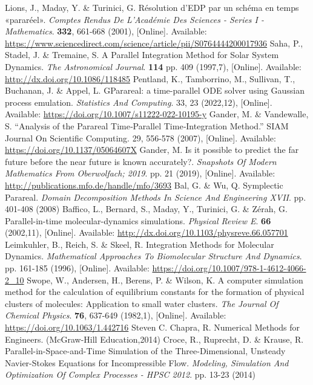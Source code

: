 \documentclass[conference]{IEEEtran}
\begin{document}
\begin{thebibliography}{00}
Lions, J., Maday, Y. \& Turinici, G. Résolution d'EDP par un schéma en temps «pararéel». {\em Comptes Rendus De L'Académie Des Sciences - Series I - Mathematics}. \textbf{332}, 661-668 (2001), [Online]. Available: \url{https://www.sciencedirect.com/science/article/pii/S0764444200017936}
Saha, P., Stadel, J. \& Tremaine, S. A Parallel Integration Method for Solar System Dynamics. {\em The Astronomical Journal}. \textbf{114} pp. 409 (1997,7), [Online]. Available: \url{http://dx.doi.org/10.1086/118485}
Pentland, K., Tamborrino, M., Sullivan, T., Buchanan, J. \& Appel, L. GParareal: a time-parallel ODE solver using Gaussian process emulation. {\em Statistics And Computing}. 33, 23 (2022,12), [Online]. Available: \url{https://doi.org/10.1007/s11222-022-10195-y}
Gander, M. \& Vandewalle, S. ``Analysis of the Parareal Time‐Parallel Time‐Integration Method.'' SIAM Journal On Scientific Computing. 29, 556-578 (2007), [Online]. Available: \url{https://doi.org/10.1137/05064607X}
Gander, M. Is it possible to predict the far future before the near future is known accurately?. {\em Snapshots Of Modern Mathematics From Oberwolfach; 2019}. pp. 21 (2019), [Online]. Available: \url{http://publications.mfo.de/handle/mfo/3693}
Bal, G. \& Wu, Q. Symplectic Parareal. {\em Domain Decomposition Methods In Science And Engineering XVII}. pp. 401-408 (2008)
Baffico, L., Bernard, S., Maday, Y., Turinici, G. \& Zérah, G. Parallel-in-time molecular-dynamics simulations. {\em Physical Review E}. \textbf{66} (2002,11), [Online]. Available: \url{http://dx.doi.org/10.1103/physreve.66.057701}
Leimkuhler, B., Reich, S. \& Skeel, R. Integration Methods for Molecular Dynamics. {\em Mathematical Approaches To Biomolecular Structure And Dynamics}. pp. 161-185 (1996), [Online]. Available: \url{https://doi.org/10.1007/978-1-4612-4066-2_10}
Swope, W., Andersen, H., Berens, P. \& Wilson, K. A computer simulation method for the calculation of equilibrium constants for the formation of physical clusters of molecules: Application to small water clusters. {\em The Journal Of Chemical Physics}. \textbf{76}, 637-649 (1982,1), [Online]. Available: \url{https://doi.org/10.1063/1.442716}
Steven C. Chapra, R. Numerical Methods for Engineers. (McGraw-Hill Education,2014)
Croce, R., Ruprecht, D. \& Krause, R. Parallel-in-Space-and-Time Simulation of the Three-Dimensional, Unsteady Navier-Stokes Equations for Incompressible Flow. {\em Modeling, Simulation And Optimization Of Complex Processes - HPSC 2012}. pp. 13-23 (2014)

\end{thebibliography}
\end{document}
